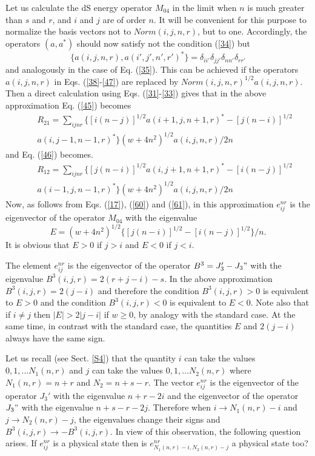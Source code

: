 \documentclass[a4paper,12pt]{article}%
\begin{document}
\begin{sloppypar}
Let us calculate the dS energy operator $M_{04}$
in the limit when $n$ is much greater than $s$
and $r$, and $i$ and $j$ are of order $n$. 
It will be convenient for this purpose to normalize
the basis vectors not to $Norm(i,j,n,r)$, but to
one. Accordingly, the operators $(a,a^*)$ should
now satisfy not the condition (\ref{34}) but
\begin{equation}
\{a(i,j,n,r),a(i',j',n',r')^*\}=
\delta_{ii'}\delta_{jj'}\delta_{nn'}\delta_{rr'}
\label{59}
\end{equation}
and analogously in the case of Eq. (\ref{35}). 
This can be achieved if the operators $a(i,j,n,r)$
in Eqs. (\ref{38}-\ref{47}) are replaced by
$Norm(i,j,n,r)^{1/2}a(i,j,n,r)$. Then a direct
calculation using Eqs. (\ref{31}-\ref{33}) gives
that in the above approximation Eq. (\ref{45}) becomes
\begin{eqnarray}
&&R_{21}=\sum_{ijnr}\{[i(n-j)]^{1/2}
a(i+1,j,n+1,r)^*-[j(n-i)]^{1/2}\nonumber\\
&&a(i,j-1,n-1,r)^*\}(w+4n^2)^{1/2}a(i,j,n,r)/2n
\label{60}
\end{eqnarray}
and Eq. (\ref{46}) becomes.
\begin{eqnarray}
&&R_{12}=\sum_{ijnr}\{[j(n-i)]^{1/2}
a(i,j+1,n+1,r)^*-[i(n-j)]^{1/2}\nonumber\\
&&a(i-1,j,n-1,r)^*\}(w+4n^2)^{1/2}a(i,j,n,r)/2n
\label{61}
\end{eqnarray}
Now, as follows from Eqs. (\ref{17}), (\ref{60})
and (\ref{61}), in this approximation $e^{nr}_{ij}$
is the eigenvector of the operator $M_{04}$ with
the eigenvalue
$$E=(w+4n^2)^{1/2}\{[j(n-i)]^{1/2}-[i(n-j)]^{1/2}\}/n.$$ 
It is obvious that $E>0$ if $j>i$ and $E<0$ if $j<i$. 
\end{sloppypar}


The element $e^{nr}_{ij}$ is the eigenvector of the operator 
$B^3=J_3'-J_3"$ with the eigenvalue $B^3(i,j,r)=2(r+j-i)-s$. 
In the above approximation $B^3(i,j,r)=2(j-i)$ 
and therefore the condition $B^3(i,j,r)>0$ is equivalent to 
$E>0$ and the condition $B^3(i,j,r)<0$ is equivalent to $E<0$.
Note also that if $i\neq j$ then $|E|>2|j-i|$ if $w\geq 0$,
by analogy with the standard case. At the same time,
in contrast with the standard case, the quantities $E$
and $2(j-i)$ always have the same sign.

Let us recall (see Sect. \ref{S4}) that the quantity
$i$ can take the values $0,1,...N_1(n,r)$ and $j$
can take the values $0,1,...N_2(n,r)$ where 
$N_1(n,r)=n+r$ and $N_2=n+s-r$. The vector $e^{nr}_{ij}$
is the eigenvector of the operator $J_3'$ with the
eigenvalue $n+r-2i$ and the eigenvector of the operator 
$J_3"$ with the eigenvalue $n+s-r-2j$. Therefore when
$i\rightarrow N_1(n,r)-i$ and $j\rightarrow N_2(n,r)-j$,
the eigenvalues change their signs and 
$B^3(i,j,r)\rightarrow -B^3(i,j,r)$. In view of this 
observation, the following question arises. If
$e^{nr}_{ij}$ is a physical state then is 
$e^{nr}_{N_1(n,r)-i,N_2(n,r)-j}$ a physical state too?
\end{document}
